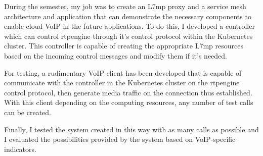 During the semester, my job was to create an L7mp proxy and
a service mesh architecture and application that can demonstrate
the necessary components to enable cloud VoIP in the future
applications. To do this, I developed a controller which can control rtpengine
through it's control protocol within the Kubernetes cluster.
This controller is capable of creating the appropriate L7mp resources based on the 
incoming control messages and modify them if it's needed.

For testing, a rudimentary VoIP client has been developed that is capable of
communicate with the controller in the Kubernetes cluster on the rtpengine control 
protocol,
then generate media traffic on the connection thus established. With this client
depending on the computing resources, any number of test calls can be created.

Finally, I tested the system created in this way with as many calls as possible and 
I evaluated the possibilities provided by the system based on VoIP-specific indicators. 

\vfill
\selectthesislanguage

\setcounter{romanPage}{\value{page}}
